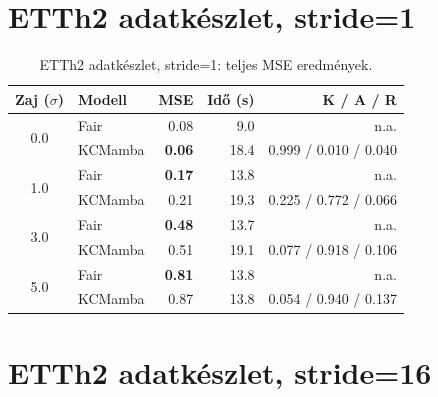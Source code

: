 \section{ETTh2 adatkészlet, stride=1}

\begin{table}[H]
    \centering
    \small
    \begin{tabular}{|c|l|r|r|r|}
        \hline
        \textbf{Zaj ($\sigma$)} & \textbf{Modell} & \textbf{MSE} & \textbf{Idő (s)} & \textbf{K / A / R} \\
        \hline\hline
        \multirow{2}{*}{0.0}
            & Fair      & 0.08 & 9.0 & n.a. \\
            & KCMamba & \textbf{0.06} & 18.4 & 0.999 / 0.010 / 0.040 \\
        \hline
        \multirow{2}{*}{1.0}
            & Fair      & \textbf{0.17} & 13.8 & n.a. \\
            & KCMamba & 0.21 & 19.3 & 0.225 / 0.772 / 0.066 \\
        \hline
        \multirow{2}{*}{3.0}
            & Fair      & \textbf{0.48} & 13.7 & n.a. \\
            & KCMamba & 0.51 & 19.1 & 0.077 / 0.918 / 0.106 \\
        \hline
        \multirow{2}{*}{5.0}
            & Fair      & \textbf{0.81} & 13.8 & n.a. \\
            & KCMamba & 0.87 & 13.8 & 0.054 / 0.940 / 0.137 \\
        \hline
    \end{tabular}
    \caption{ETTh2 adatkészlet, stride=1: teljes MSE eredmények.}
    \label{tab:full_etth2_s1}
\end{table}

\section{ETTh2 adatkészlet, stride=16}


